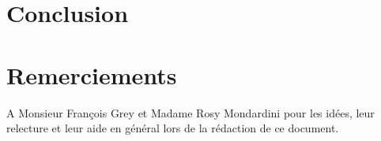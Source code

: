 \documentclass[10pt, article]{llncs}
\begin{document}
\section{Conclusion}\label{sec:conclusion}

\section*{Remerciements}
	A Monsieur François Grey et Madame Rosy Mondardini pour les idées, leur relecture et leur aide en général lors de la rédaction de ce document.


\fancyhf{}


\end{document}
